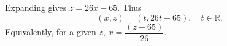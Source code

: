 Expanding gives $z=26x-65$. Thus
\[
\boxed{(x,z)=(t,26t-65),\quad t\in\mathbb R}.
\]
Equivalently, for a given $z$, $x=\dfrac{(z+65)}{26}$.
